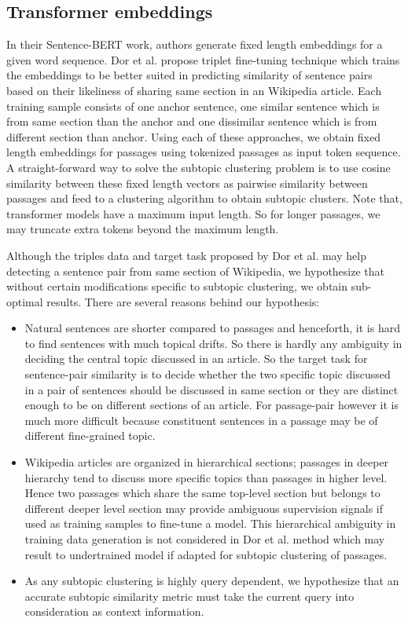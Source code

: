 \documentclass[sigconf,authordraft]{acmart}
\begin{document}
\subsection{Transformer embeddings} In their Sentence-BERT work, authors generate fixed length embeddings for a given word sequence. Dor et al. \cite{dor2018learning} propose triplet fine-tuning technique which trains the embeddings to be better suited in predicting similarity of sentence pairs based on their likeliness of sharing same section in an Wikipedia article. Each training sample consists of one anchor sentence, one similar sentence which is from same section than the anchor and one dissimilar sentence which is from different section than anchor. Using each of these approaches, we obtain fixed length embeddings for passages using tokenized passages as input token sequence. A straight-forward way to solve the subtopic clustering problem is to use cosine similarity between these fixed length vectors as pairwise similarity between passages and feed to a clustering algorithm to obtain subtopic clusters. Note that, transformer models have a maximum input length. So for longer passages, we may truncate extra tokens beyond the maximum length. 

Although the triples data and target task proposed by Dor et al. may help detecting a sentence pair from same section of Wikipedia, we hypothesize that without certain modifications specific to subtopic clustering, we obtain sub-optimal results. There are several reasons behind our hypothesis: 
\begin{itemize}
    \item Natural sentences are shorter compared to passages and henceforth, it is hard to find sentences with much topical drifts. So there is hardly any ambiguity in deciding the central topic discussed in an article. So the target task for sentence-pair similarity is to decide whether the two specific topic discussed in a pair of sentences should be discussed in same section or they are distinct enough to be on different sections of an article. For passage-pair however it is much more difficult because constituent sentences in a passage may be of different fine-grained topic.
    \item Wikipedia articles are organized in hierarchical sections; passages in deeper hierarchy tend to discuss more specific topics than passages in higher level. Hence two passages which share the same top-level section but belongs to different deeper level section may provide ambiguous supervision signals if used as training samples to fine-tune a model. This hierarchical ambiguity in training data generation is not considered in Dor et al. method which may result to undertrained model if adapted for subtopic clustering of passages.
    \item As any subtopic clustering is highly query dependent, we hypothesize that an accurate subtopic similarity metric must take the current query into consideration as context information.
\end{itemize}
\end{document}
